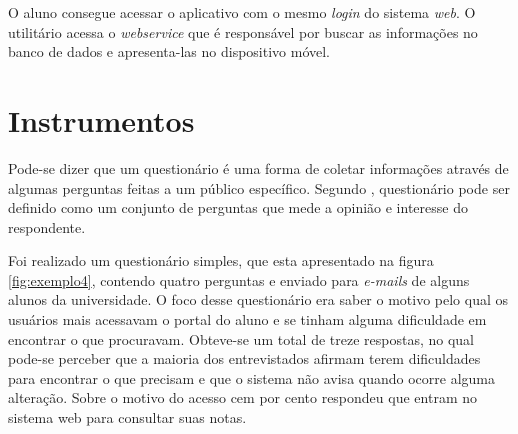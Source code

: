 	\par O aluno consegue acessar o aplicativo com o mesmo \textit{login} do
sistema \textit{web}. O utilitário acessa o \textit{webservice} que é
responsável por buscar as informações no banco de dados e apresenta-las no
dispositivo móvel.
	
\section{Instrumentos}

	\par Pode-se dizer que um questionário é uma forma de coletar informações
através de algumas perguntas feitas a um público específico. Segundo
, questionário pode ser definido como um conjunto
de perguntas que mede a opinião e interesse do respondente.
	
	\par Foi realizado um questionário simples, que esta apresentado na figura
\ref{fig:exemplo4}, contendo quatro perguntas e enviado para \textit{e-mails} de
alguns alunos da universidade. O foco desse questionário era saber o motivo pelo qual
os usuários mais acessavam o portal do aluno e se tinham alguma dificuldade em
encontrar o que procuravam. Obteve-se um total de treze respostas, no qual
pode-se perceber que a maioria dos entrevistados afirmam terem dificuldades
para encontrar o que precisam e que o sistema não avisa quando ocorre alguma
alteração. Sobre o motivo do acesso cem por cento respondeu que entram no
sistema web para consultar suas notas.

